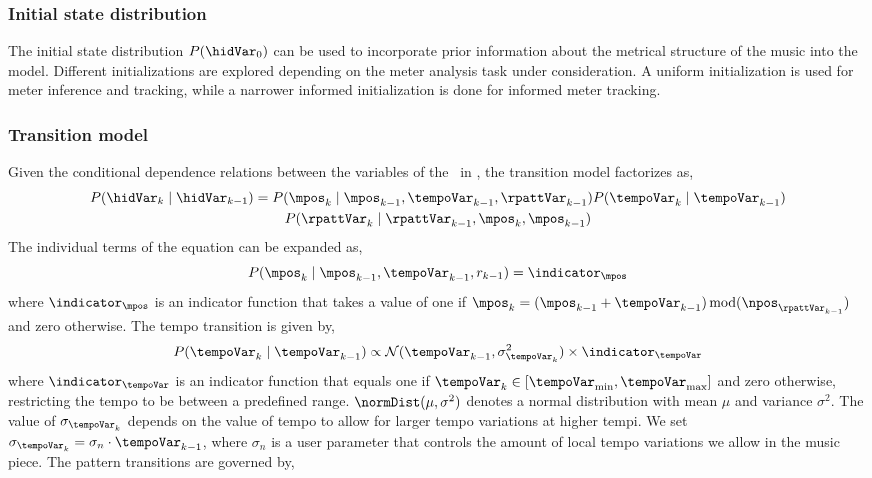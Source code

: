 \subsubsection{Initial state distribution}
The initial state distribution $P(\hidVar_{0})$ can be used to incorporate prior information about the metrical structure of the music into the model. Different initializations are explored depending on the meter analysis task under consideration. A uniform initialization is used for meter inference and tracking, while a narrower informed initialization is done for informed meter tracking. 
\subsubsection{Transition model}
Given the conditional dependence relations between the variables of the \bpmodel\ in , the transition model factorizes as, 
\begin{multline}\label{eqn:bpm:transx}
P(\hidVar_{k} \mid \hidVar_{k-1})=P(\mpos_{k} \mid \mpos_{k-1},\tempoVar_{k-1},\rpattVar_{k-1})P(\tempoVar_{k} \mid \tempoVar_{k-1}) \\ P(\rpattVar_{k} \mid \rpattVar_{k-1},\mpos_{k},\mpos_{k-1})
\end{multline}
The individual terms of the equation can be expanded as, 
\begin{equation}\label{eqn:bpm:transmpos}
P(\mpos_{k} \mid \mpos_{k-1},\tempoVar_{k-1},r_{k-1})=\indicator_{\mpos}
\end{equation}
where $\indicator_{\mpos}$ is an indicator function that takes a value of one if $\mpos_{k} = (\mpos_{k-1} + \tempoVar_{k-1})\!\!\!\mod\!\!(\npos_{\rpattVar_{k-1}})$ and zero otherwise. The tempo transition is given by,
\begin{equation}\label{eqn:bpm:transtempo}
P(\tempoVar_{k} \mid \tempoVar_{k-1})\propto\mathcal{N}(\tempoVar_{k-1},\sigma_{\tempoVar_k}^{2})\times \indicator_{\tempoVar}
\end{equation}
where $\indicator_{\tempoVar}$ is an indicator function that equals one if $\tempoVar_{k} \in [\tempoVar_{\textrm{min}}, \tempoVar_{\textrm{max}}]$ and zero otherwise, restricting the tempo to be between a predefined range. $\normDist(\mu,\sigma^2)$ denotes a normal distribution with mean $\mu$ and variance $\sigma^{2}$. The value of $\sigma_{\tempoVar_{k}}$ depends on the value of tempo to allow for larger tempo variations at higher tempi. %
We set $\sigma_{\tempoVar_k} = \sigma_n \cdot \tempoVar_{k-1}$, where $\sigma_n$ is a user parameter that controls the amount of local tempo variations we allow in the music piece. The pattern transitions are governed by, 
